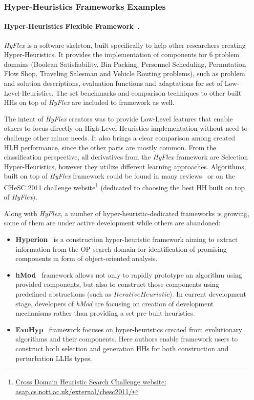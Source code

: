 \subsubsection{Hyper-Heuristics Frameworks Examples}\label{bg: hh fw examples}
\paragraph{Hyper-Heuristics Flexible Framework~\cite{ochoa2012hyflex}.} \textit{HyFlex} is a software skeleton, built specifically to help other researchers creating Hyper-Heuristics. It provides the implementation of components for 6 problem domains (Boolean Satisfiability, Bin Packing, Personnel Scheduling, Permutation Flow Shop, Traveling Salesman and Vehicle Routing problems), such as problem and solution descriptions, evaluation functions and adaptations for set of Low-Level-Heuristics. The set benchmarks and comparison techniques to other built HHs on top of \textit{HyFlex} are included to framework as well. 

The intent of \textit{HyFlex} creators was to provide Low-Level features that enable others to focus directly on High-Level-Heuristics implementation without need to challenge other minor needs. It also brings a clear comparison among created HLH performance, since the other parts are mostly common. From the classification perspective, all derivatives from the \textit{HyFlex} framework are Selection Hyper-Heuristics, however they utilize different learning approaches. Algorithms, built on top of \textit{HyFlex} framework could be found in many reviews~\cite{misir2012intelligent,ryser2014review,drake2019recent} or on the CHeSC 2011 challenge website\footnote{\href{http://www.asap.cs.nott.ac.uk/external/chesc2011/}{Cross Domain Heuristic Search Challenge website: asap.cs.nott.ac.uk/external/chesc2011/}} (dedicated to choosing the best HH built on top of \textit{HyFlex}).

Along with \textit{HyFlex}, a number of hyper-heuristic-dedicated frameworks is growing, some of them are under active development while others are abandoned:
\begin{itemize}
	\item \textbf{Hyperion}~\cite{swan2011hyperion} is a construction hyper-heuristic framework aiming to extract information from the OP search domain for identification of promising components in form of object-oriented analysis.
	
	\item \textbf{hMod}~\cite{urra2013hMod} framework allows not only to rapidly prototype an algorithm using provided components, but also to construct those components using predefined abstractions (such as $IterativeHeuristic$). In current development stage, developers of \textit{hMod} are focusing on creation of development mechanisms rather than providing a set pre-built heuristics. 
	
	\item \textbf{EvoHyp}~\cite{pillay2017evohyp} framework focuses on hyper-heuristics created from evolutionary algorithms and their components. Here authors enable framework users to construct both selection and generation HHs for both construction and perturbation LLHs types.
\end{itemize}


